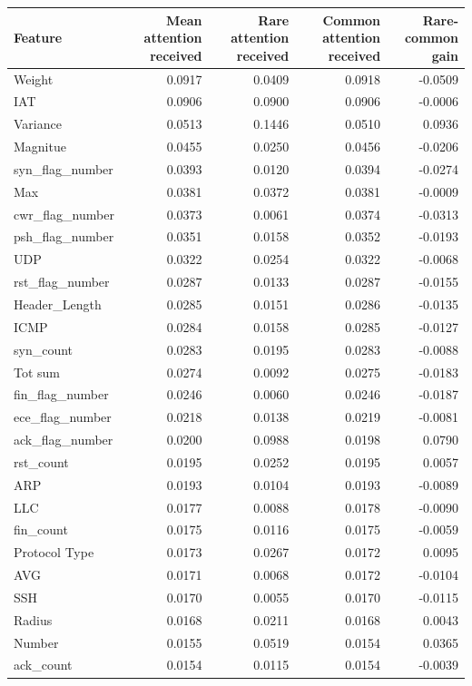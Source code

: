 \begin{tabular}{lrrrr}
\toprule
Feature & Mean attention received & Rare attention received & Common attention received & Rare-common gain \\
\midrule
Weight & 0.0917 & 0.0409 & 0.0918 & -0.0509 \\
IAT & 0.0906 & 0.0900 & 0.0906 & -0.0006 \\
Variance & 0.0513 & 0.1446 & 0.0510 & 0.0936 \\
Magnitue & 0.0455 & 0.0250 & 0.0456 & -0.0206 \\
syn\_flag\_number & 0.0393 & 0.0120 & 0.0394 & -0.0274 \\
Max & 0.0381 & 0.0372 & 0.0381 & -0.0009 \\
cwr\_flag\_number & 0.0373 & 0.0061 & 0.0374 & -0.0313 \\
psh\_flag\_number & 0.0351 & 0.0158 & 0.0352 & -0.0193 \\
UDP & 0.0322 & 0.0254 & 0.0322 & -0.0068 \\
rst\_flag\_number & 0.0287 & 0.0133 & 0.0287 & -0.0155 \\
Header\_Length & 0.0285 & 0.0151 & 0.0286 & -0.0135 \\
ICMP & 0.0284 & 0.0158 & 0.0285 & -0.0127 \\
syn\_count & 0.0283 & 0.0195 & 0.0283 & -0.0088 \\
Tot sum & 0.0274 & 0.0092 & 0.0275 & -0.0183 \\
fin\_flag\_number & 0.0246 & 0.0060 & 0.0246 & -0.0187 \\
ece\_flag\_number & 0.0218 & 0.0138 & 0.0219 & -0.0081 \\
ack\_flag\_number & 0.0200 & 0.0988 & 0.0198 & 0.0790 \\
rst\_count & 0.0195 & 0.0252 & 0.0195 & 0.0057 \\
ARP & 0.0193 & 0.0104 & 0.0193 & -0.0089 \\
LLC & 0.0177 & 0.0088 & 0.0178 & -0.0090 \\
fin\_count & 0.0175 & 0.0116 & 0.0175 & -0.0059 \\
Protocol Type & 0.0173 & 0.0267 & 0.0172 & 0.0095 \\
AVG & 0.0171 & 0.0068 & 0.0172 & -0.0104 \\
SSH & 0.0170 & 0.0055 & 0.0170 & -0.0115 \\
Radius & 0.0168 & 0.0211 & 0.0168 & 0.0043 \\
Number & 0.0155 & 0.0519 & 0.0154 & 0.0365 \\
ack\_count & 0.0154 & 0.0115 & 0.0154 & -0.0039 \\

\end{tabular}
